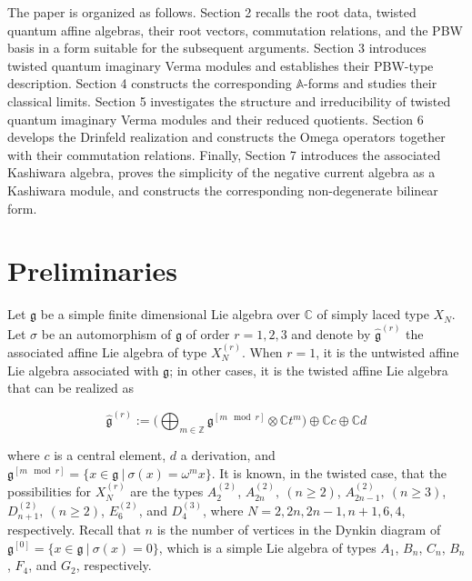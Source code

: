 \documentclass[12pt]{amsart}
\numberwithin{equation}{section}
\newcommand{\C}{\ensuremath{\mathbb{C}}}
\newcommand{\g}{\ensuremath{\mathfrak{g}}}
\newcommand{\mb}[1]{\mathbb{#1}}
\begin{document}
The paper is organized as follows. Section 2 recalls the root data, twisted quantum affine algebras, their root vectors, commutation relations, and the PBW basis in a form suitable for the subsequent arguments. Section 3 introduces twisted quantum imaginary Verma modules and establishes their PBW-type description. Section 4 constructs the corresponding $\mathbb A$-forms and studies their classical limits. Section 5 investigates the structure and irreducibility of twisted quantum imaginary Verma modules and their reduced quotients. Section 6 develops the Drinfeld realization and constructs the Omega operators together with their commutation relations. Finally, Section 7 introduces the associated Kashiwara algebra, proves the simplicity of the negative current algebra as a Kashiwara module, and constructs the corresponding non-degenerate bilinear form.







\section{Preliminaries}\label{prelims}

Let $\g$ be a simple finite dimensional Lie algebra over $\C$ of simply laced type $X_N$. Let $\sigma$ be an automorphism of $\g$ of order $r= 1,2,3$ and denote by $\hat{\g}^{(r)}$ the associated affine Lie algebra of type $X_N^{(r)}$. When $r=1$, it is the untwisted affine Lie algebra associated with $\g$; in other cases, it is the twisted affine Lie algebra that can be realized as

$$ \hat{\g}^{(r)}  :=  \Big(\bigoplus_{m\in \mb{Z}} \g^{[m \mod r]} \otimes \mb{C}t^{m} \Big) \oplus \C c \oplus \C d$$

where $c$ is a central element, $d$ a derivation, and $\g^{[m \mod r]} = \{ x \in \g \ |\ \sigma(x) = \omega^{m}x\}$. It is known, in the twisted case, that the possibilities for $X_N^{(r)}$ are the types $A_2^{(2)}$, $A_{2n}^{(2)}, \ (n\geq 2)$, $A_{2n-1}^{(2)}, \ (n \geq 3)$, $D_{n+1}^{(2)}, \ (n \geq 2)$, $E_6^{(2)}$, and $D_4^{(3)}$, where $N = 2, 2n, 2n-1, n+1, 6, 4$, respectively. Recall that $n$ is the number of vertices in the Dynkin diagram of $\g^{[0]} = \{x \in \g \ | \ \sigma(x) = 0\}$, which is a simple Lie algebra of types $A_1$, $B_n$, $C_n$, $B_n$, $F_4$, and $G_2$, respectively. \\
\end{document}

